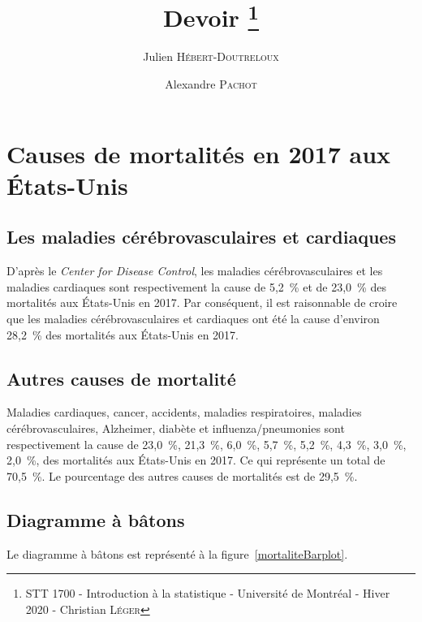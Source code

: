 \documentclass[10pt,twocolumn]{article}
\title{Devoir \no 1\thanks{STT 1700 - Introduction à la statistique - Université de Montréal - Hiver 2020 - Christian \textsc{Léger}}}
\author{Julien \textsc{Hébert-Doutreloux} \and Alexandre \textsc{Pachot}}
\begin{document}

\maketitle
\tableofcontents



\section{Causes de mortalités en 2017 aux États-Unis}
\subsection{Les maladies cérébrovasculaires et cardiaques}
D’après le \textit{Center for Disease Control}, les maladies cérébrovasculaires et les maladies cardiaques sont respectivement la cause de 5,2~\% et de 23,0~\% des mortalités aux États-Unis en 2017. Par conséquent, il est raisonnable de croire que les maladies cérébrovasculaires et cardiaques ont été la cause d’environ 28,2~\% des mortalités aux États-Unis en 2017.


\subsection{Autres causes de mortalité}
Maladies cardiaques, cancer, accidents, maladies respiratoires, maladies cérébrovasculaires, Alzheimer, diabète et influenza/pneumonies sont respectivement la cause de 23,0~\%, 21,3~\%, 6,0~\%, 5,7~\%, 5,2~\%, 4,3~\%, 3,0~\%, 2,0~\%, des mortalités aux États-Unis en 2017. Ce qui représente un total de 70,5~\%. Le pourcentage des autres causes de mortalités est de 29,5~\%.


\subsection{Diagramme à bâtons}
Le diagramme à bâtons est représenté à la figure~\ref{mortaliteBarplot}.
\end{document}
